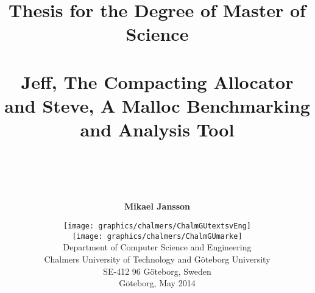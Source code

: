 \begin{titlepage}
\thispagestyle{empty}

\title{{\Large Thesis for the Degree of Master of Science}
     \\ ~
     \\ \bf Jeff, The Compacting Allocator and Steve, A Malloc Benchmarking and Analysis Tool
     \\ ~
     \\ ~
      }

\author{\Large \bf Mikael Jansson}

\date{
  \enlargethispage{2.1\baselineskip}
  \texttt{[image: graphics/chalmers/ChalmGUtextsvEng]} \\
  \vspace{5mm}
  \texttt{[image: graphics/chalmers/ChalmGUmarke]} \\
  \vspace{12mm}
  Department of Computer Science and Engineering \\
  Chalmers University of Technology
    and G\"{o}teborg University \\
  SE-412 96 G\"{o}teborg, Sweden \\
  \vspace{12mm}
  G{\"o}teborg, May 2014
}

\end{titlepage}

\maketitle

\newpage{}
\thispagestyle{empty}
\mbox{}

\noindent

